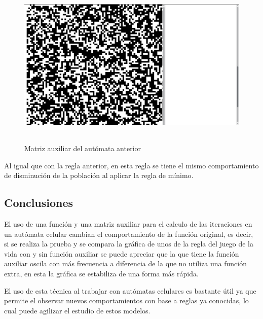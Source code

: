 \documentclass[12pt, titlepage]{article}
\begin{document}
\begin{figure}[H]
\begin{center}
 \includegraphics[width=15cm, height=8cm]{./img/2336-paridad-aux.png}
 \caption{Matriz auxiliar del autómata anterior}
 \label{fig:2336-paridad-aux}
\end{center}
\end{figure}

Al igual que con la regla anterior, en esta regla se tiene el mismo comportamiento de disminución de la población al aplicar la regla de mínimo.

\subsection{Conclusiones}
El uso de una función y una matriz auxiliar para el calculo de las iteraciones en un autómata celular cambian el comportamiento de la función original, es decir, si se realiza la prueba y se compara la gráfica de unos de la regla del juego de la vida con y sin función auxiliar se puede apreciar que la que tiene la función auxiliar oscila con más frecuencia a diferencia de la que no utiliza una función extra, en esta la gráfica se estabiliza de una forma más rápida.

El uso de esta técnica al trabajar con autómatas celulares es bastante útil ya que permite el observar nuevos comportamientos con base a reglas ya conocidas, lo cual puede agilizar el estudio de estos modelos.



\end{document}
